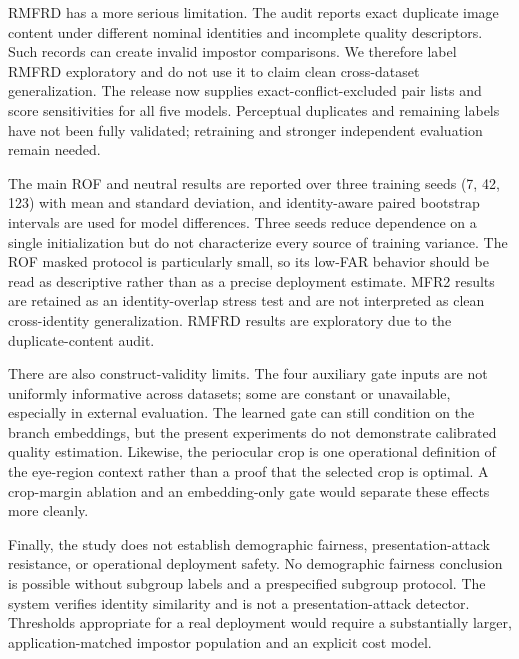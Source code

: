 \documentclass[10pt,journal,compsoc]{IEEEtran}
\begin{document}
RMFRD has a more serious limitation. The audit reports exact duplicate image content under different nominal identities and incomplete quality descriptors. Such records can create invalid impostor comparisons. We therefore label RMFRD exploratory and do not use it to claim clean cross-dataset generalization. The release now supplies exact-conflict-excluded pair lists and score sensitivities for all five models. Perceptual duplicates and remaining labels have not been fully validated; retraining and stronger independent evaluation remain needed.

The main ROF and neutral results are reported over three training seeds (7, 42, 123) with mean and standard deviation, and identity-aware paired bootstrap intervals are used for model differences. Three seeds reduce dependence on a single initialization but do not characterize every source of training variance. The ROF masked protocol is particularly small, so its low-FAR behavior should be read as descriptive rather than as a precise deployment estimate. MFR2 results are retained as an identity-overlap stress test and are not interpreted as clean cross-identity generalization. RMFRD results are exploratory due to the duplicate-content audit.

There are also construct-validity limits. The four auxiliary gate inputs are not uniformly informative across datasets; some are constant or unavailable, especially in external evaluation. The learned gate can still condition on the branch embeddings, but the present experiments do not demonstrate calibrated quality estimation. Likewise, the periocular crop is one operational definition of the eye-region context rather than a proof that the selected crop is optimal. A crop-margin ablation and an embedding-only gate would separate these effects more cleanly.

Finally, the study does not establish demographic fairness, presentation-attack resistance, or operational deployment safety. No demographic fairness conclusion is possible without subgroup labels and a prespecified subgroup protocol. The system verifies identity similarity and is not a presentation-attack detector. Thresholds appropriate for a real deployment would require a substantially larger, application-matched impostor population and an explicit cost model.
\end{document}
